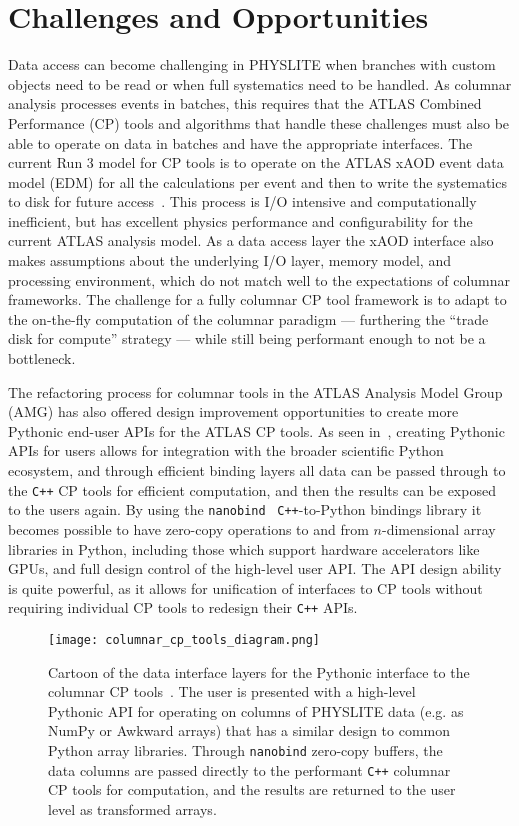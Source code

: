 \section{Challenges and Opportunities}\label{sec:challenges}

Data access can become challenging in PHYSLITE when branches with custom objects need to be read or when full systematics need to be handled.
As columnar analysis processes events in batches, this requires that the ATLAS Combined Performance (CP) tools and algorithms that handle these challenges must also be able to operate on data in batches and have the appropriate interfaces.
The current Run 3 model for CP tools is to operate on the ATLAS xAOD event data model (EDM) for all the calculations per event and then to write the systematics to disk for future access~\cite{SOFT-2022-02}.
This process is I/O intensive and computationally inefficient, but has excellent physics performance and configurability for the current ATLAS analysis model.
As a data access layer the xAOD interface also makes assumptions about the underlying I/O layer, memory model, and processing environment, which do not match well to the expectations of columnar frameworks.
The challenge for a fully columnar CP tool framework is to adapt to the on-the-fly computation of the columnar paradigm --- furthering the ``trade disk for compute'' strategy --- while still being performant enough to not be a bottleneck.

The refactoring process for columnar tools in the ATLAS Analysis Model Group (AMG) has also offered design improvement opportunities to create more Pythonic end-user APIs for the ATLAS CP tools.
As seen in~, creating Pythonic APIs for users allows for integration with the broader scientific Python ecosystem, and through efficient binding layers all data can be passed through to the \texttt{C++} CP tools for efficient computation, and then the results can be exposed to the users again.
By using the \texttt{nanobind}~\cite{nanobind} \texttt{C++}-to-Python bindings library it becomes possible to have zero-copy operations to and from $n$-dimensional array libraries in Python, including those which support hardware accelerators like GPUs, and full design control of the high-level user API.
The API design ability is quite powerful, as it allows for unification of interfaces to CP tools without requiring individual CP tools to redesign their \texttt{C++} APIs.

\begin{figure}
    \centering
    \texttt{[image: columnar\_cp\_tools\_diagram.png]}
    \caption{Cartoon of the data interface layers for the Pythonic interface to the columnar CP tools~\cite{Vigl:ACAT_2024}.
The user is presented with a high-level Pythonic API for operating on columns of PHYSLITE data (e.g. as NumPy or Awkward arrays) that has a similar design to common Python array libraries.
Through \texttt{nanobind} zero-copy buffers, the data columns are passed directly to the performant \texttt{C++} columnar CP tools for computation, and the results are returned to the user level as transformed arrays.}
    \label{fig:columnar_cp_tools_diagram}
\end{figure}
